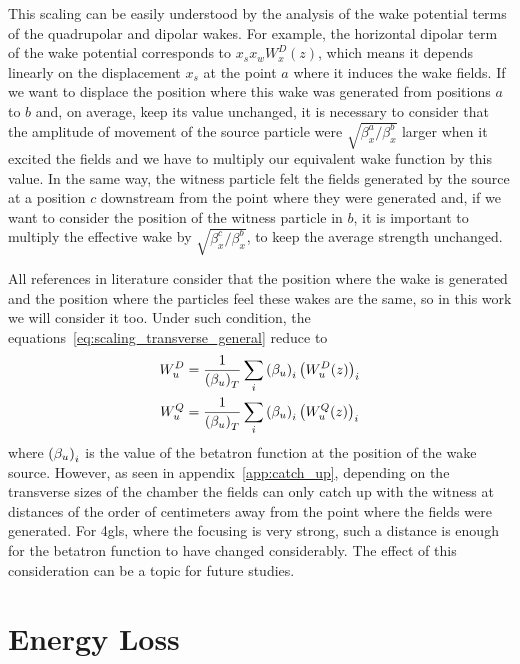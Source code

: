     This scaling can be easily understood by the analysis of the wake potential terms of the quadrupolar and dipolar wakes. For example, the horizontal dipolar term of the wake potential corresponds to $x_sx_wW_x^D(z)$, which means it depends linearly on the displacement $x_s$ at the point $a$ where it induces the wake fields. If we want to displace the position where this wake was generated from positions $a$ to $b$ and, on average, keep its value unchanged, it is necessary to consider that the amplitude of movement of the source particle were $\sqrt{\beta_x^a/\beta_x^b}$ larger when it excited the fields and we have to multiply our equivalent wake function by this value. In the same way, the witness particle felt the fields generated by the source at a position $c$ downstream from the point where they were generated and, if we want to consider the position of the witness particle in $b$, it is important to multiply the effective wake by $\sqrt{\beta_x^c/\beta_x^b}$, to keep the average strength unchanged.

    All references in literature consider that the position where the wake is generated and the position where the particles feel these wakes are the same, so in this work we will consider it too. Under such condition, the equations~\eqref{eq:scaling_transverse_general} reduce to
    \begin{align}\label{eq:scaling_transverse_general}\nonumber
        W_u^D &=\frac{1}{\left(\beta_u\right)_T} \sum_i \left(\beta_u\right)_i\left(W_u^D(z)\right)_i \\
        W_u^Q &=\frac{1}{\left(\beta_u\right)_T} \sum_i \left(\beta_u\right)_i\left(W_u^Q(z)\right)_i
    \end{align}
    where $\left(\beta_u\right)_i$ is the value of the betatron function at the position of the wake source. However, as seen in appendix~\ref{app:catch_up}, depending on the transverse sizes of the chamber the fields can only catch up with the witness at distances of the order of centimeters away from the point where the fields were generated. For \gls{4gls}, where the focusing is very strong, such a distance is enough for the betatron function to have changed considerably. The effect of this consideration can be a topic for future studies.

\section{Energy Loss}\label{sec:energy_loss}

